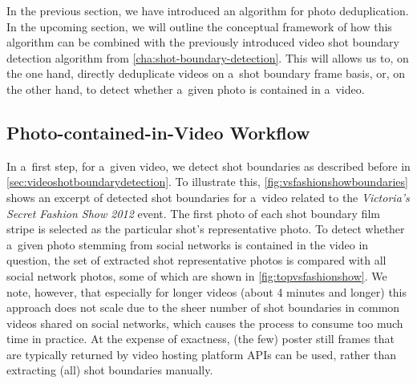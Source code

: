 In the previous section, we have introduced
an algorithm for photo deduplication.
In the upcoming section, we will outline the conceptual framework
of how this algorithm can be combined with the previously introduced
video shot boundary detection algorithm from \autoref{cha:shot-boundary-detection}.
This will allows us to, on the one hand,
directly deduplicate videos on a~shot boundary frame basis,
or, on the other hand, to detect
whether a~given photo is contained in a~video.

\subsection{Photo-contained-in-Video Workflow}

In a~first step, for a~given video, we detect shot boundaries
as described before in \autoref{sec:videoshotboundarydetection}.
To illustrate this,
\autoref{fig:vsfashionshowboundaries} shows an excerpt
of detected shot boundaries for a~video related to
the \emph{Victoria's Secret Fashion Show 2012} event.
The first photo of each shot boundary film stripe
is selected as the particular shot's representative photo.
To detect whether a~given photo stemming from social networks
is contained in the video in question,
the set of extracted shot representative photos is compared
with all social network photos,
some of which are shown in \autoref{fig:topvsfashionshow}.
We note, however, that especially for longer videos
(about 4 minutes and longer)
this approach does not scale due to the sheer number of shot boundaries
in common videos shared on social networks,
which causes the process to consume too much time in practice.
At the expense of exactness, (the few) poster still frames
that are typically returned by video hosting platform APIs
can be used, rather than extracting (all) shot boundaries manually.

